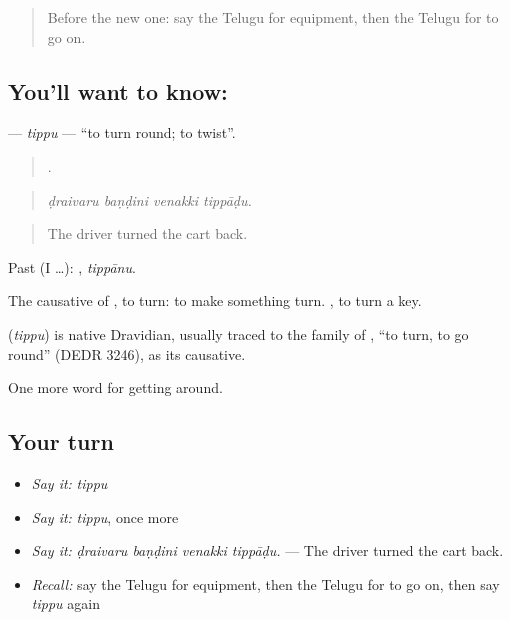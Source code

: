 \label{lesson:TE-C493-tippu}



\begin{quote}
Before the new one: say the Telugu for equipment, then the Telugu for to go on.
\end{quote}

\subsection*{You'll want to know: }
\textbf{} — \emph{tippu} — \textquotedblleft{}to turn round; to twist\textquotedblright{}.

\begin{quote}
   .
\end{quote}

\begin{quote}
\emph{ḍraivaru baṇḍini venakki tippāḍu.}
\end{quote}

\begin{quote}
The driver turned the cart back.
\end{quote}

Past (I …): , \emph{tippānu}.

The causative of , to turn: to make something turn.  , to turn a key.

\begin{cousinweb}
\textbf{} (\emph{tippu}) is native Dravidian, usually traced to the family of , \textquotedblleft{}to turn, to go round\textquotedblright{} (DEDR 3246), as its causative.
\end{cousinweb}

\begin{grammarlens}[title={What you've built}]
One more word for getting around.
\end{grammarlens}

\subsection*{Your turn}
\begin{itemize}
\raggedright
  \item \emph{Say it:} \emph{tippu}
  \item \emph{Say it:} \emph{tippu}, once more
  \item \emph{Say it:} \emph{ḍraivaru baṇḍini venakki tippāḍu.} — The driver turned the cart back.
  \item \emph{Recall:} say the Telugu for equipment, then the Telugu for to go on, then say \emph{tippu} again
\end{itemize}

